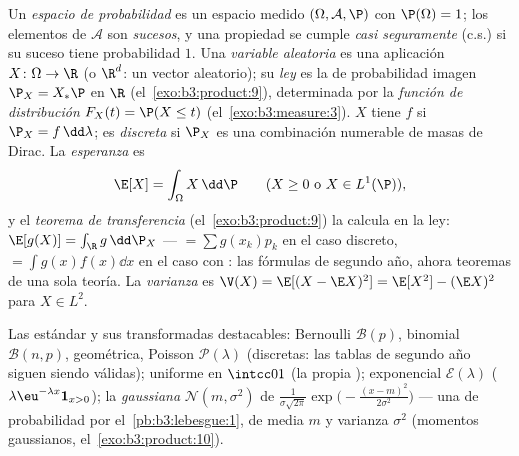 \begin{definition}\label{def:b3:probability:space}
Un \emph{espacio de probabilidad} es un
espacio medido
$(\Omega, \mathcal A, \P)$ con $\P(\Omega) =
1$; los elementos de $\mathcal A$ son \emph{sucesos}, y una propiedad se
cumple \emph{casi seguramente} (c.s.) si su suceso tiene probabilidad
$1$. Una \emph{variable aleatoria} es una
aplicación 
$X \colon \Omega \to \R$ (o $\R^d$: un vector aleatorio); su
\emph{ley} es la
 de probabilidad imagen $\P_X =
X_*\P$ en $\R$ (el~\cref{exo:b3:product:9}), determinada por la
\emph{función de distribución} $F_X(t) = \P(X \leq t)$
(el~\cref{exo:b3:measure:3}). $X$ tiene
\emph{} $f$ si
$\P_X = f\,\dd\lambda$; es \emph{discreta} si $\P_X$ es una combinación
numerable de masas de Dirac. La \emph{esperanza} es
\[
\E[X] = \int_\Omega X\,\dd\P
\qquad (X \geq 0 \text{ o } X \in L^1(\P)),
\]
y el \emph{teorema de transferencia} (el~\cref{exo:b3:product:9}) la
calcula en la ley: $\E[g(X)] = \int_\R g\,\dd\P_X$ ---
$= \sum g(x_k)p_k$ en el caso discreto, $= \int
g(x)f(x)\dd x$ en el caso con :
las fórmulas de segundo año, ahora teoremas de una sola teoría. La
\emph{varianza} es $\V(X) =
\E[(X - \E X)^2] = \E[X^2] - (\E X)^2$ para $X \in L^2$.
\end{definition}

\begin{example}\label{ex:b3:probability:laws}
Las  estándar y sus
transformadas destacables: Bernoulli $\mathcal B(p)$, binomial
$\mathcal B(n, p)$, geométrica, Poisson $\mathcal P(\lambda)$
(discretas: las tablas de segundo año siguen siendo válidas); uniforme
en $\intcc01$ (la propia ); exponencial $\mathcal E(\lambda)$
(
$\lambda\eu^{-\lambda x}\mathbf 1_{x>0}$); la \emph{gaussiana} $\mathcal N(m, \sigma^2)$ de
$\frac1{\sigma\sqrt{2\pi}}\exp\bigl(-\frac{(x -
m)^2}{2\sigma^2}\bigr)$ --- una 
de probabilidad por el~\cref{pb:b3:lebesgue:1}, de media $m$ y varianza
$\sigma^2$ (momentos gaussianos, el~\cref{exo:b3:product:10}).
\end{example}

